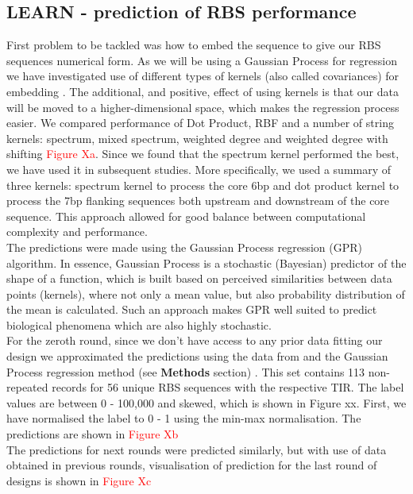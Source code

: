 \documentclass{article}
\begin{document}
\subsection{LEARN - prediction of RBS performance}
First problem to be tackled was how to embed the sequence to give our RBS sequences numerical form. As we will be using a Gaussian Process for regression we have investigated use of different types of kernels (also called covariances) for embedding \cite{Ben-Hur2008}. The additional, and positive, effect of using kernels is that our data will be moved to a higher-dimensional space, which makes the regression process easier. We compared performance of Dot Product, RBF and a number of string kernels: spectrum, mixed spectrum, weighted degree and weighted degree with shifting \textcolor{red}{Figure Xa}. Since we found that the spectrum kernel performed the best, we have used it in subsequent studies. More specifically, we used a summary of three kernels: spectrum kernel to process the core 6bp and dot product kernel to process the 7bp flanking sequences both upstream and downstream of the core sequence. This approach allowed for good balance between computational complexity and performance.\\
The predictions were made using the Gaussian Process regression (GPR) algorithm. In essence, Gaussian Process is a stochastic (Bayesian) predictor of the shape of a function, which is built based on  perceived similarities between data points (kernels), where not only a mean value, but also probability distribution of the mean is calculated. Such an approach makes GPR well suited to predict biological phenomena which are also highly stochastic. \\
For the zeroth round, since we don't have access to any prior data fitting our design we approximated the predictions using the data from \textcite{jervis2018machine} and the Gaussian Process regression method (see \textbf{Methods} section) \cite{srinivas2012information}. This set contains 113 non-repeated records for 56 unique RBS sequences with the respective TIR. The label values are between 0 - 100,000 and skewed, which is shown in Figure xx. First, we have normalised the label to 0 - 1 using the min-max normalisation. The predictions are shown in \textcolor{red}{Figure Xb}\\
The predictions for next rounds were predicted similarly, but with use of data obtained in previous rounds, visualisation of prediction for the last round of designs is shown in \textcolor{red}{Figure Xc} \\
\end{document}
